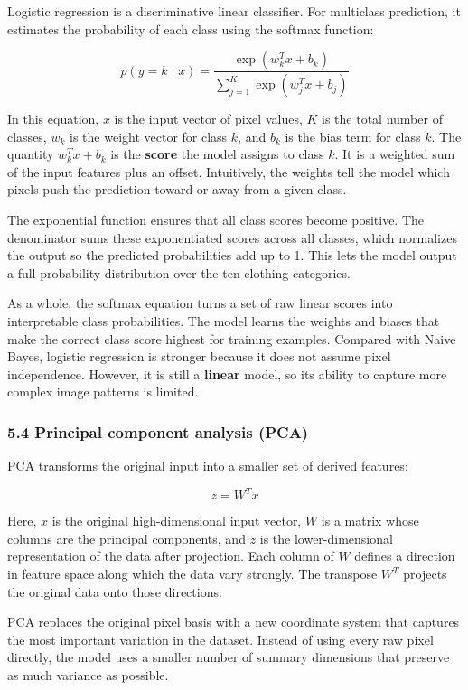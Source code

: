 \documentclass[11pt]{article}
\begin{document}
Logistic regression is a discriminative linear classifier. For
multiclass prediction, it estimates the probability of each class using
the softmax function:

\[
p(y = k \mid x) = \frac{\exp(w_k^T x + b_k)}{\sum_{j=1}^{K} \exp(w_j^T x + b_j)}
\]

In this equation, \(x\) is the input vector of pixel values, \(K\) is
the total number of classes, \(w_k\) is the weight vector for class
\(k\), and \(b_k\) is the bias term for class \(k\). The quantity
\(w_k^T x + b_k\) is the \textbf{score} the model assigns to class
\(k\). It is a weighted sum of the input features plus an offset.
Intuitively, the weights tell the model which pixels push the prediction
toward or away from a given class.

The exponential function ensures that all class scores become positive.
The denominator sums these exponentiated scores across all classes,
which normalizes the output so the predicted probabilities add up to 1.
This lets the model output a full probability distribution over the ten
clothing categories.

As a whole, the softmax equation turns a set of raw linear scores into
interpretable class probabilities. The model learns the weights and
biases that make the correct class score highest for training examples.
Compared with Naive Bayes, logistic regression is stronger because it
does not assume pixel independence. However, it is still a
\textbf{linear} model, so its ability to capture more complex image
patterns is limited.

\subsubsection{5.4 Principal component analysis
(PCA)}\label{principal-component-analysis-pca}

PCA transforms the original input into a smaller set of derived
features:

\[
z = W^T x
\]

Here, \(x\) is the original high-dimensional input vector, \(W\) is a
matrix whose columns are the principal components, and \(z\) is the
lower-dimensional representation of the data after projection. Each
column of \(W\) defines a direction in feature space along which the
data vary strongly. The transpose \(W^T\) projects the original data
onto those directions.

PCA replaces the original pixel basis with a new coordinate system that
captures the most important variation in the dataset. Instead of using
every raw pixel directly, the model uses a smaller number of summary
dimensions that preserve as much variance as possible.
\end{document}
